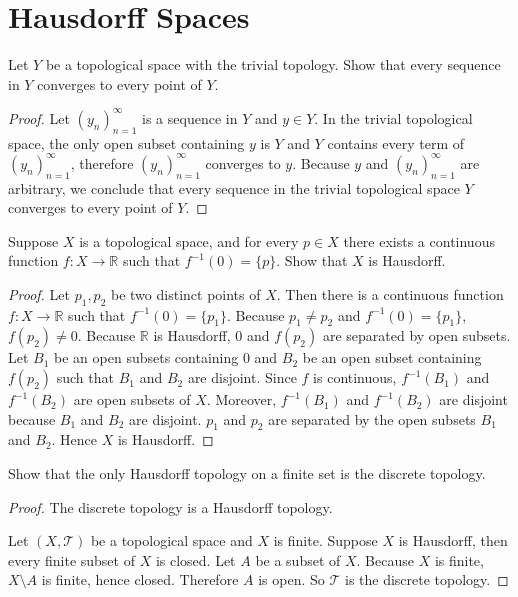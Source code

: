 \section*{Hausdorff Spaces}

\begin{exercise}{2.33}
	Let $Y$ be a topological space with the trivial topology. Show that every sequence in $Y$ converges to every point of $Y$.
\end{exercise}

\begin{proof}
	Let ${(y_{n})}^{\infty}_{n=1}$ is a sequence in $Y$ and $y\in Y$. In the trivial topological space, the only open subset containing $y$ is $Y$ and $Y$ contains every term of ${(y_{n})}^{\infty}_{n=1}$, therefore ${(y_{n})}^{\infty}_{n=1}$ converges to $y$. Because $y$ and ${(y_{n})}^{\infty}_{n=1}$ are arbitrary, we conclude that every sequence in the trivial topological space $Y$ converges to every point of $Y$.
\end{proof}

\begin{exercise}{2.35}
	Suppose $X$ is a topological space, and for every $p\in X$ there exists a continuous function $f: X\to \mathbb{R}$ such that $f^{-1}(0) = \{ p \}$. Show that $X$ is Hausdorff.
\end{exercise}

\begin{proof}
	Let $p_{1}, p_{2}$ be two distinct points of $X$. Then there is a continuous function $f: X\to\mathbb{R}$ such that $f^{-1}(0) = \{ p_{1} \}$. Because $p_{1}\ne p_{2}$ and $f^{-1}(0) = \{ p_{1} \}$, $f(p_{2})\ne 0$. Because $\mathbb{R}$ is Hausdorff, $0$ and $f(p_{2})$ are separated by open subsets. Let $B_{1}$ be an open subsets containing $0$ and $B_{2}$ be an open subset containing $f(p_{2})$ such that $B_{1}$ and $B_{2}$ are disjoint. Since $f$ is continuous, $f^{-1}(B_{1})$ and $f^{-1}(B_{2})$ are open subsets of $X$. Moreover, $f^{-1}(B_{1})$ and $f^{-1}(B_{2})$ are disjoint because $B_{1}$ and $B_{2}$ are disjoint. $p_{1}$ and $p_{2}$ are separated by the open subsets $B_{1}$ and $B_{2}$. Hence $X$ is Hausdorff.
\end{proof}

\begin{exercise}{2.38}
	Show that the only Hausdorff topology on a finite set is the discrete topology.
\end{exercise}

\begin{proof}
	The discrete topology is a Hausdorff topology.

	Let $(X, \mathscr{T})$ be a topological space and $X$ is finite. Suppose $X$ is Hausdorff, then every finite subset of $X$ is closed. Let $A$ be a subset of $X$. Because $X$ is finite, $X\setminus A$ is finite, hence closed. Therefore $A$ is open. So $\mathscr{T}$ is the discrete topology.
\end{proof}

